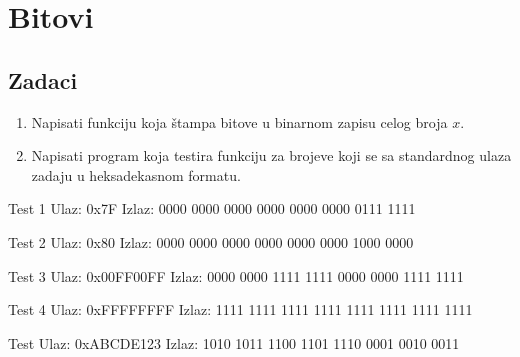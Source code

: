 
\chapter{Bitovi}

\section{Zadaci}



\begin{Exercise}[label=201]
\begin{enumerate}
\item Napisati funkciju  koja štampa bitove u binarnom zapisu celog broja $x$.
\item Napisati program koja testira funkciju  za brojeve koji se sa standardnog ulaza zadaju u heksadekasnom formatu.
\end{enumerate}

\begin{maxitest}
\begin{test}{Test 1}
Ulaz:   0x7F  
Izlaz:  0000 0000 0000 0000 0000 0000 0111 1111    
\end{test}
\end{maxitest}

\begin{maxitest}
\begin{test}{Test 2}
Ulaz:   0x80
Izlaz:  0000 0000 0000 0000 0000 0000 1000 0000 
\end{test}
\end{maxitest}

\begin{maxitest}
\begin{test}{Test 3}
Ulaz:   0x00FF00FF
Izlaz:  0000 0000 1111 1111 0000 0000 1111 1111
\end{test}
\end{maxitest}

\begin{maxitest}
\begin{test}{Test 4}
Ulaz:   0xFFFFFFFF
Izlaz:  1111 1111 1111 1111 1111 1111 1111 1111 
\end{test}
\end{maxitest}

\begin{maxitest}
\begin{test}{Test }
Ulaz:   0xABCDE123
Izlaz:  1010 1011 1100 1101 1110 0001 0010 0011
\end{test}
\end{maxitest}
\end{Exercise}
\begin{Answer}[ref=201]
\end{Answer}

